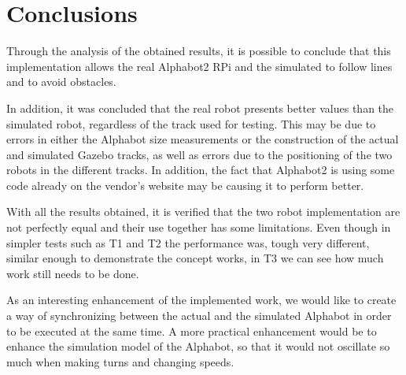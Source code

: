 \documentclass[conference]{IEEEtran}
\begin{document}
\section{Conclusions} \label{conclusions}
Through the analysis of the obtained results, it is possible to conclude that this implementation allows the real Alphabot2 RPi and the simulated to follow lines and to avoid obstacles.

In addition, it was concluded that the real robot presents better values than the simulated robot, regardless of the track used for testing. This may be due to errors in either the Alphabot size measurements or the construction of the actual and simulated Gazebo tracks, as well as errors due to the positioning of the two robots in the different tracks. In addition, the fact that Alphabot2 is using some code already on the vendor's website may be causing it to perform better.

With all the results obtained, it is verified that the two robot implementation are not perfectly equal and their use together has some limitations. Even though in simpler tests such as T1 and T2 the performance was, tough very different, similar enough to demonstrate the concept works, in T3 we can see how much work still needs to be done.

As an interesting enhancement of the implemented work, we would like to create a way of synchronizing between the actual and the simulated Alphabot in order to be executed at the same time. A more practical enhancement would be to enhance the simulation model of the Alphabot, so that it would not oscillate so much when making turns and changing speeds.
\end{document}
